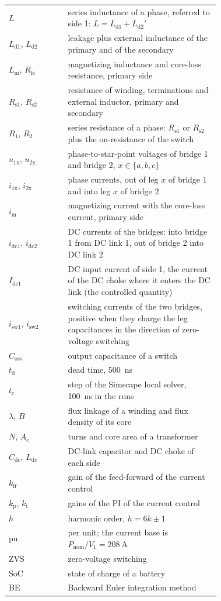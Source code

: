 \documentclass[12pt,a4paper]{scrartcl}
\newcommand{\ped}[1]{_{\mathrm{#1}}}
\begin{document}
\begin{onehalfspace}
\begin{longtable}{@{} l p{0.72\linewidth} @{}}
	$L$ & series inductance of a phase, referred to side 1: $L = L\ped{d1} + L\ped{d2}'$ \\
	$L\ped{d1}$, $L\ped{d2}$ & leakage plus external inductance of the primary and of the secondary \\
	$L\ped{m}$, $R\ped{fe}$ & magnetizing inductance and core-loss resistance, primary side \\
	$R\ped{s1}$, $R\ped{s2}$ & resistance of winding, terminations and external inductor, primary and secondary \\
	$R\ped{1}$, $R\ped{2}$ & series resistance of a phase: $R\ped{s1}$ or $R\ped{s2}$ plus the on-resistance of the switch \\
	$u\ped{1x}$, $u\ped{2x}$ & phase-to-star-point voltages of bridge 1 and bridge 2, $x \in \{a, b, c\}$ \\
	$i\ped{1x}$, $i\ped{2x}$ & phase currents, out of leg $x$ of bridge 1 and into leg $x$ of bridge 2 \\
	$i\ped{m}$ & magnetizing current with the core-loss current, primary side \\
	$i\ped{dc1}$, $i\ped{dc2}$ & DC currents of the bridges: into bridge 1 from DC link 1, out of bridge 2 into DC link 2 \\
	$I\ped{dc1}$ & DC input current of side 1, the current of the DC choke where it enters the DC link (the controlled quantity) \\
	$i\ped{sw1}$, $i\ped{sw2}$ & switching currents of the two bridges, positive when they charge the leg capacitances in the direction of zero-voltage switching \\
	$C\ped{oss}$ & output capacitance of a switch \\
	$t\ped{d}$ & dead time, \SI{500}{\nano\second} \\
	$t\ped{c}$ & step of the Simscape local solver, \SI{100}{\nano\second} in the runs \\
	$\lambda$, $B$ & flux linkage of a winding and flux density of its core \\
	$N$, $A\ped{c}$ & turns and core area of a transformer \\
	$C\ped{dc}$, $L\ped{dc}$ & DC-link capacitor and DC choke of each side \\
	$k\ped{ff}$ & gain of the feed-forward of the current control \\
	$k\ped{p}$, $k\ped{i}$ & gains of the PI of the current control \\
	$h$ & harmonic order, $h = 6k \pm 1$ \\
	pu & per unit; the current base is $P\ped{nom}/V\ped{1} = \SI{208}{\ampere}$ \\
	ZVS & zero-voltage switching \\
	SoC & state of charge of a battery \\
	BE & Backward Euler integration method \\
\end{longtable}
\addtocounter{table}{-1}
\endgroup

\end{onehalfspace}
\end{document}
